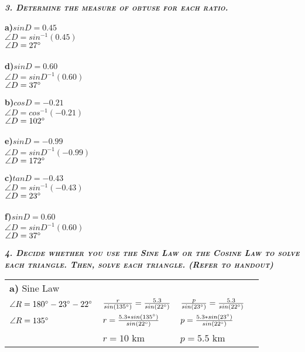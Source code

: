 \documentclass{article}
\begin{document}
\textbf{\emph{\textsc{3. Determine the measure of obtuse  for each ratio.}}}
\begin{multicols}{3}
    \textbf{a)$sinD=0.45$} \\
    $\angle{D}=sin^{-1}(0.45)$ \\
    $\angle{D}=27\degree$ \\ \\
    \textbf{d)$sinD=0.60$} \\
    $\angle{D}=sinD^{-1}(0.60)$ \\
    $\angle{D}=37\degree$ \\
    \columnbreak
    
    \textbf{b)$cosD=-0.21$} \\
    $\angle{D}=cos^{-1}(-0.21)$ \\
    $\angle{D}=102\degree$ \\ \\
    \textbf{e)$sinD=-0.99$} \\
    $\angle{D}=sinD^{-1}(-0.99)$ \\
    $\angle{D}=172\degree$ \\
    \columnbreak
    
    \textbf{c)$tanD=-0.43$} \\
    $\angle{D}=sin^{-1}(-0.43)$ \\
    $\angle{D}=23\degree$ \\ \\
    \textbf{f)$sinD=0.60$} \\
    $\angle{D}=sinD^{-1}(0.60)$ \\
    $\angle{D}=37\degree$ \\
    \columnbreak    
\end{multicols}

\newpage

\textbf{\emph{\textsc{4. Decide whether you use the Sine Law or the Cosine Law to solve each triangle. Then, solve each triangle. (Refer to handout)}}}

\begin{tabular}{l l l l}
    \textbf{a)} Sine Law & &
    & \\
    $\angle{R}=180\degree-23\degree-22\degree$ & $\frac{r}{sin(135\degree)}=\frac{5.3}{sin(22\degree)}$ & $\frac{p}{sin(23\degree)}=\frac{5.3}{sin(22\degree)}$
    & \\
    $\angle{R}=135\degree$ & $r=\frac{5.3*sin(135\degree)}{sin(22\degree)}$ & $p=\frac{5.3*sin(23\degree)}{sin(22\degree)}$
    & \\
    & $r=10$ km & $p=5.5$ km
\end{tabular}
\end{document}

